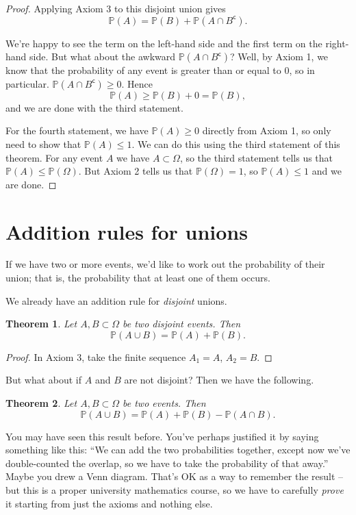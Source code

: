 \documentclass[
  a4paper,
]{book}
\newtheorem{theorem}{Theorem}[chapter]
\theoremstyle{definition}
\theoremstyle{definition}
\theoremstyle{definition}
\theoremstyle{definition}
\theoremstyle{remark}
\begin{document}
\begin{proof}
Applying Axiom 3 to this disjoint union gives
\[ \mathbb P(A) =  \mathbb P(B) + \mathbb P(A \cap B^\mathsf{c}) . \]

We're happy to see the term on the left-hand side and the first term on the right-hand side. But what about the awkward \(\mathbb P(A \cap B^\mathsf{c})\)? Well, by Axiom 1, we know that the probability of any event is greater than or equal to 0, so in particular. \(\mathbb P(A \cap B^\mathsf{c}) \geq 0\). Hence
\[ \mathbb P(A)  \geq \mathbb P(B) + 0 = \mathbb P(B) , \]
and we are done with the third statement.

For the fourth statement, we have \(\mathbb P(A) \geq 0\) directly from Axiom 1, so only need to show that \(\mathbb P(A) \leq 1\). We can do this using the third statement of this theorem. For any event \(A\) we have \(A \subset \Omega\), so the third statement tells us that \(\mathbb P(A) \leq \mathbb P(\Omega)\). But Axiom 2 tells us that \(\mathbb P(\Omega) = 1\), so \(\mathbb P(A) \leq 1\) and we are done.
\end{proof}

\hypertarget{addition}{%
\section{Addition rules for unions}\label{addition}}

If we have two or more events, we'd like to work out the probability of their union; that is, the probability that at least one of them occurs.

We already have an addition rule for \emph{disjoint} unions.

\begin{theorem}
Let \(A, B \subset \Omega\) be two disjoint events. Then
\[ \mathbb P(A \cup B) = \mathbb P(A) + \mathbb P(B) . \]
\end{theorem}

\begin{proof}
In Axiom 3, take the finite sequence \(A_1 = A\), \(A_2 = B\).
\end{proof}

But what about if \(A\) and \(B\) are not disjoint? Then we have the following.

\begin{theorem}
Let \(A, B \subset \Omega\) be two events. Then
\[ \mathbb P(A \cup B) = \mathbb P(A) + \mathbb P(B) - \mathbb P(A \cap B) . \]
\end{theorem}

You may have seen this result before. You've perhaps justified it by saying something like this: ``We can add the two probabilities together, except now we've double-counted the overlap, so we have to take the probability of that away.'' Maybe you drew a Venn diagram. That's OK as a way to remember the result -- but this is a proper university mathematics course, so we have to carefully \emph{prove} it starting from just the axioms and nothing else.
\end{document}
